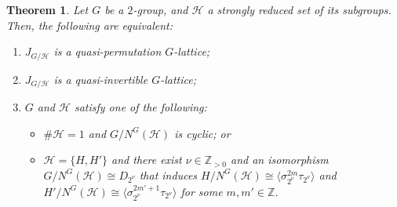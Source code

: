 \documentclass[12pt]{amsart}
\theoremstyle{plain}
\newtheorem{thm}{Theorem}[section]
\theoremstyle{definition}
\numberwithin{thm}{section}
\numberwithin{equation}{section}
\newcommand{\Zpn}{\mathbb{Z}_{>0}}
\newcommand{\Z}{\mathbb{Z}}
\newcommand{\cH}{\mathcal{H}}
\begin{document}
\begin{thm}\label{thm:tnqi}
Let $G$ be a $2$-group, and $\cH$ a strongly reduced set of its subgroups. Then, the following are equivalent:
\begin{enumerate}
\item $J_{G/\cH}$ is a quasi-permutation $G$-lattice; 
\item $J_{G/\cH}$ is a quasi-invertible $G$-lattice; 
\item $G$ and $\cH$ satisfy one of the following: 
\begin{itemize}
    \item[(iii-I)] $\#\cH=1$ and $G/N^{G}(\cH)$ is cyclic; or
    \item[(iii-I\hspace{-1pt}I)] $\cH=\{H,H'\}$ and there exist $\nu \in \Zpn$ and an isomorphism $G/N^{G}(\cH) \cong D_{2^{\nu}}$ that induces $H/N^{G}(\cH)\cong \langle \sigma_{2^{\nu}}^{2m}\tau_{2^{\nu}} \rangle$ and $H'/{N^{G}(\cH)}\cong \langle \sigma_{2^{\nu}}^{2m'+1}\tau_{2^{\nu}} \rangle$ for some $m,m'\in \Z$. 
\end{itemize}
\end{enumerate}
\end{thm}
\end{document}
